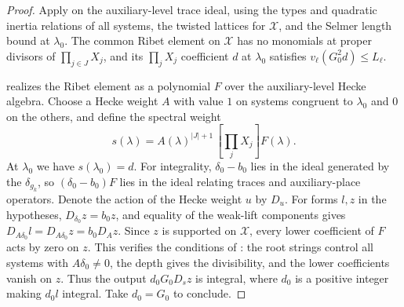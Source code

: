 \begin{proof}
Apply  on the auxiliary-level trace ideal, using the types and quadratic inertia relations of all systems, the twisted lattices for $\mathcal X$, and the Selmer length bound at $\lambda_0$. The common Ribet element on $\mathcal X$ has no monomials at proper divisors of $\prod_{j\in J}X_j$, and its $\prod_j X_j$ coefficient $d$ at $\lambda_0$ satisfies $v_\ell(G_0^2d)\le L_\ell$.

 realizes the Ribet element as a polynomial $F$ over the auxiliary-level Hecke algebra. Choose a Hecke weight $A$ with value $1$ on systems congruent to $\lambda_0$ and $0$ on the others, and define the spectral weight
\[
 s(\lambda)=A(\lambda)^{|J|+1}\,[\textstyle\prod_j X_j]F(\lambda).
\]
At $\lambda_0$ we have $s(\lambda_0)=d$. For integrality, $\delta_0-b_0$ lies in the ideal generated by the $\delta_{g_k}$, so $(\delta_0-b_0)F$ lies in the ideal relating traces and auxiliary-place operators. Denote the action of the Hecke weight $u$ by $D_u$. For forms $l,z$ in the hypotheses, $D_{\delta_0}z=b_0z$, and equality of the weak-lift components gives $D_{A\delta_0}l=D_{A\delta_0}z=b_0D_Az$. Since $z$ is supported on $\mathcal X$, every lower coefficient of $F$ acts by zero on $z$. This verifies the conditions of : the root strings control all systems with $A\delta_0\ne0$, the depth gives the divisibility, and the lower coefficients vanish on $z$. Thus the output $d_0G_0 D_s z$ is integral, where $d_0$ is a positive integer making $d_0l$ integral. Take $d_0=G_0$ to conclude.
\end{proof}

